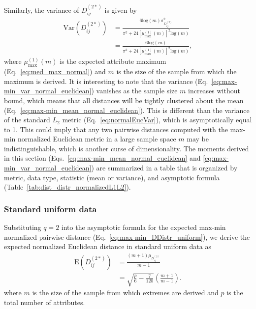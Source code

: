 \documentclass[aoas]{imsart}
\begin{document}
Similarly, the variance of $D^{(2*)}_{ij}$ is given by
%
\begin{equation}\label{eq:max-min_var_normal_euclidean}
\begin{aligned}
\text{Var}\left(D^{(2*)}_{ij}\right) &= \frac{6\text{log}(m)\sigma^2_{D^{(2)}_{ij}}}{\pi^2 + 24\left[\mu^{(1)}_\text{max}(m)\right]^2\text{log}(m)} \\
&= \frac{6\text{log}(m)}{\pi^2 + 24\left[\mu^{(1)}_\text{max}(m)\right]^2\text{log}(m)},
\end{aligned}
\end{equation}
%
where $\mu^{(1)}_\text{max}(m)$ is the expected attribute maximum (Eq.~\ref{eq:med_max_normal}) and $m$ is the size of the sample from which the maximum is derived. It is interesting to note that the variance (Eq.~\ref{eq:max-min_var_normal_euclidean}) vanishes as the sample size $m$ increases without bound, which means that all distances will be tightly clustered about the mean (Eq.~\ref{eq:max-min_mean_normal_euclidean}). This is different than the variance of the standard $L_2$ metric (Eq.~\ref{eq:normalEucVar}), which is asymptotically equal to 1. This could imply that any two pairwise distances computed with the max-min normalized Euclidean metric in a large sample space $m$ may be indistinguishable, which is another curse of dimensionality. The moments derived in this section (Eqs.~\ref{eq:max-min_mean_normal_euclidean} and \ref{eq:max-min_var_normal_euclidean}) are summarized in a table that is organized by metric, data type, statistic (mean or variance), and asymptotic formula (Table~\ref{tab:dist_distr_normalizedL1L2}).

\subsubsection{Standard uniform data}

Substituting $q=2$ into the asymptotic formula for the expected max-min normalized pairwise distance (Eq.~\ref{eq:max-min_DDistr_uniform}), we derive the expected normalized Euclidean distance in standard uniform data as
%
\begin{equation}\label{eq:max-min_mean_uniform_euclidean}
\begin{aligned}
\text{E}\left(D^{(2*)}_{ij}\right) &= \frac{(m+1)\mu_{D^{(2)}_{ij}}}{m-1} \\
&= \sqrt{\frac{p}{6} - \frac{7}{120}}\left(\frac{m+1}{m-1}\right).
\end{aligned}
\end{equation}
%
where $m$ is the size of the sample from which extremes are derived and $p$ is the total number of attributes.
\end{document}
